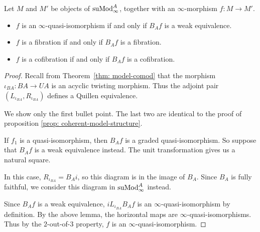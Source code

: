 \documentclass[../thesis.tex]{subfiles}
\begin{document}
            \begin{proposition}
                Let $M$ and $M'$ be objects of $\tt{suMod}_\infty^A$, together with an $\infty$-morphism $f : M \to M'$.
                \begin{itemize}
                    \item $f$ is an $\infty$-quasi-isomorphism if and only if $B_Af$ is a weak equivalence.
                    \item $f$ is a fibration if and only if $B_Af$ is a fibration.
                    \item $f$ is a cofibration if and only if $B_Af$ is a cofibration.
                \end{itemize}
            \end{proposition}

            \begin{proof}
                Recall from Theorem~\ref{thm: model-comod} that the morphism $\iota_{BA}: BA \to UA$ is an acyclic twisting morphism. Thus the adjoint pair $(L_{\iota_{BA}}, R_{\iota_{BA}})$ defines a Quillen equivalence.

                We show only the first bullet point. The last two are identical to the proof of proposition \ref{prop: coherent-model-structure}.

                If $f_1$ is a quasi-isomorphism, then $B_Af$ is a graded quasi-isomorphism. So suppose that $B_Af$ is a weak equivalence instead. The unit transformation gives us a natural square.

                \begin{center}
                \end{center}

                In this case, $R_{\iota_{BA}} = B_Ai$, so this diagram is in the image of $B_A$. Since $B_A$ is fully faithful, we consider this diagram in $\tt{suMod}_\infty^A$ instead.

                \begin{center}
                \end{center}

                Since $B_Af$ is a weak equivalence, $iL_{\iota_{BA}}B_Af$ is an $\infty$-quasi-isomorphism by definition. By the above lemma, the horizontal maps are $\infty$-quasi-isomorphisms. Thus by the $2$-out-of-$3$ property, $f$ is an $\infty$-quasi-isomorphism.
            \end{proof}
\end{document}
